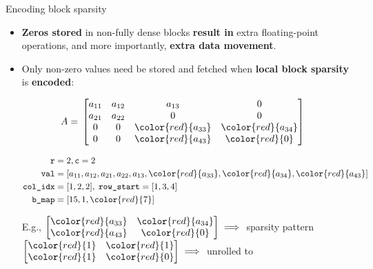 \documentclass[t,usepdftitle=false]{beamer}
\begin{document}
\begin{frame}{Encoding block sparsity}
\begin{itemize}
\item \textbf{Zeros stored} in non-fully dense blocks \textbf{result in} extra floating-point operations, and more importantly, \textbf{extra data movement}.
\item Only non-zero values need be stored and fetched when \textbf{local block sparsity} is \textbf{encoded}:\vspace{-.95cm}\\
\hspace*{-.6cm}\begin{minipage}[t]{0.4\textwidth}\vspace{.35cm}
\begin{align*}
A=&\;\left[\begin{matrix}
a_{11}&a_{12}&a_{13}&0\\
a_{21}&a_{22}&0     &0     \\
0     &0     &{\color{red}{a_{33}}}&{\color{red}{a_{34}}}\\
0     &0     &{\color{red}{a_{43}}}&{\color{red}{0}}
\end{matrix}\right]
\end{align*}
\end{minipage}
\begin{minipage}[t]{0.47\textwidth}
\begin{align*}
\texttt{r}=&\;2,\texttt{c}=2\\
\texttt{val}=&\;[a_{11}, a_{12}, a_{21}, a_{22},a_{13}, {\color{red}{a_{33}}}, {\color{red}{a_{34}}}, {\color{red}{a_{43}}}]\\
\texttt{col\_idx}=&\;[1, 2, 2],\;
\texttt{row\_start}=[1, 3, 4]\\
\texttt{b\_map}=&\;[15, 1, {\color{red}{7}}]
\end{align*}
\end{minipage}\vspace{.15cm}
E.g., 
$\begin{bmatrix}
{\color{red}{a_{33}}}&{\color{red}{a_{34}}}\\
{\color{red}{a_{43}}}&{\color{red}{0}}
\end{bmatrix}\implies$
sparsity pattern
$\begin{bmatrix}
{\color{red}{1}}&{\color{red}{1}}\\
{\color{red}{1}}&{\color{red}{0}}
\end{bmatrix}\implies$ unrolled to {\color{red}{1110}}\\

\end{itemize}
\end{frame}
\end{document}
